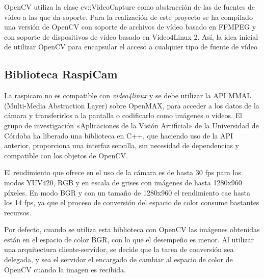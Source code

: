 OpenCV utiliza la clase cv::VideoCapture como abstracción de las de fuentes de vídeo a las que da soporte.
Para la realización de este proyecto se ha compilado una versión de OpenCV con soporte de archivos de vídeo basado en FFMPEG y con soporte de dispositivos de vídeo basado en Video4Linux 2. Así, la idea inicial de utilizar OpenCV para encapsular el acceso a cualquier tipo de fuente de vídeo 

\subsection{Biblioteca RaspiCam}
La raspicam no es compatible con \emph{video4linux} y se debe utilizar la API MMAL (Multi-Media Abstraction Layer) sobre OpenMAX, para acceder a los datos de la cámara y transferirlos a la pantalla o codificarlo como imágenes o vídeos.
El grupo de investigación «Aplicaciones de la Visión Artificial» de la Universidad de Córdoba ha liberado una biblioteca en C++, que haciendo uso de la API anterior, proporciona una interfaz sencilla, sin necesidad de dependencias y compatible con los objetos de OpenCV.

El rendimiento que ofrece en el uso de la cámara es de hasta 30 fps para los modos YUV420, RGB y en escala de grises con imágenes de hasta 1280x960 píxeles. En modo BGR y con un tamaño de 1280x960 el rendimiento cae hasta los 14 fps, ya que el proceso de conversión del espacio de color consume bastantes recursos. 

Por defecto, cuando se utiliza esta biblioteca con OpenCV las imágenes obtenidas están en el espacio de color BGR, con lo que el desempeño es menor. Al utilizar una arquitectura cliente-servidor, se decide que la tarea de conversión sea delegada, y sea el servidor el encargado de cambiar al espacio de color de OpenCV cuando la imagen es recibida.


